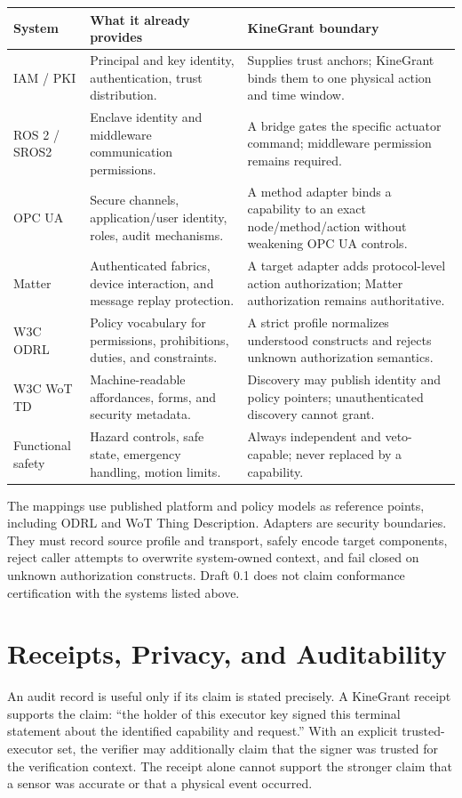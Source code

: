 \documentclass[10.5pt,a4paper]{article}
\begin{document}
\begin{tabularx}{\linewidth}{@{}p{28mm}p{52mm}Y@{}}
\toprule
\textbf{System} & \textbf{What it already provides} & \textbf{KineGrant boundary} \\
\midrule
IAM / PKI & Principal and key identity, authentication, trust distribution. & Supplies trust
anchors; KineGrant binds them to one physical action and time window. \\
ROS 2 / SROS2 & Enclave identity and middleware communication permissions. & A bridge gates the
specific actuator command; middleware permission remains required. \\
OPC UA & Secure channels, application/user identity, roles, audit mechanisms. & A method adapter
binds a capability to an exact node/method/action without weakening OPC UA controls. \\
Matter & Authenticated fabrics, device interaction, and message replay protection. & A target
adapter adds protocol-level action authorization; Matter authorization remains authoritative. \\
W3C ODRL & Policy vocabulary for permissions, prohibitions, duties, and constraints. & A strict
profile normalizes understood constructs and rejects unknown authorization semantics. \\
W3C WoT TD & Machine-readable affordances, forms, and security metadata. & Discovery may publish
identity and policy pointers; unauthenticated discovery cannot grant. \\
Functional safety & Hazard controls, safe state, emergency handling, motion limits. & Always
independent and veto-capable; never replaced by a capability. \\
\bottomrule
\end{tabularx}

The mappings use published platform and policy models as reference points, including ODRL and
WoT Thing Description\cite{odrl,wot}. Adapters are security boundaries. They must record source profile and transport, safely encode
target components, reject caller attempts to overwrite system-owned context, and fail closed on
unknown authorization constructs. Draft 0.1 does not claim conformance certification with the
systems listed above.

\section{Receipts, Privacy, and Auditability}

An audit record is useful only if its claim is stated precisely. A KineGrant receipt supports the
claim: ``the holder of this executor key signed this terminal statement about the identified
capability and request.'' With an explicit trusted-executor set, the verifier may additionally
claim that the signer was trusted for the verification context. The receipt alone cannot support
the stronger claim that a sensor was accurate or that a physical event occurred.
\end{document}
